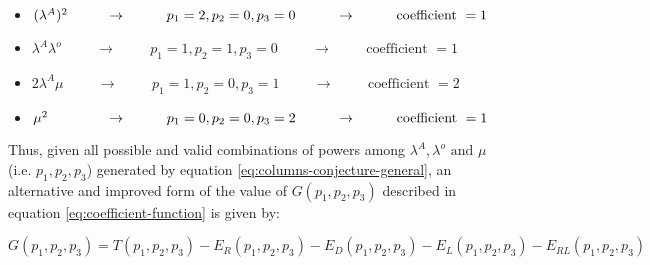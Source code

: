 \begin{itemize}
    \item \((\lambda^A)^2 \hspace{0.95cm} \rightarrow \hspace{1cm} p_1 = 2, p_2=0, p_3=0 \hspace{1cm} \rightarrow \hspace{1cm} \text{coefficient } = 1\)
    \item \(\lambda^A \lambda^o \hspace{1cm} \rightarrow \hspace{1cm} p_1 = 1, p_2=1, p_3=0 \hspace{1cm} \rightarrow \hspace{1cm} \text{coefficient } = 1\)
    \item \(2 \lambda^A \mu \hspace{1cm} \rightarrow \hspace{1cm} p_1 = 1, p_2=0, p_3=1 \hspace{1cm} \rightarrow \hspace{1cm} \text{coefficient } = 2\)
    \item \(\mu^2 \hspace{1.45cm} \rightarrow \hspace{1cm} p_1=0, p_2=0, p_3=2 \hspace{1cm} \rightarrow \hspace{1cm} \text{coefficient } = 1\)
\end{itemize}

Thus, given all possible and valid combinations of powers among \(\lambda^A, \lambda^o \text{ and } \mu\) (i.e. \(p_1,p_2,p_3\)) generated by equation \ref{eq:columns-conjecture-general}, an alternative and improved form of the value of \(G(p_1, p_2, p_3)\) described in equation \ref{eq:coefficient-function} is given by:

\begin{equation} \label{eq:permutation formula}
    G(p_1, p_2, p_3) = T(p_1, p_2, p_3) - E_R(p_1, p_2, p_3) - E_D(p_1, p_2, p_3) - E_L(p_1, p_2, p_3) - E_{RL}(p_1, p_2, p_3)
\end{equation}

